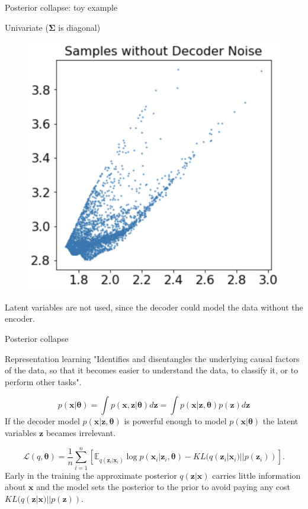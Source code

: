 \documentclass{beamer}
\newcommand{\bx}{\mathbf{x}}
\newcommand{\bz}{\mathbf{z}}
\newcommand{\bSigma}{\boldsymbol{\Sigma}}
\newcommand{\btheta}{\boldsymbol{\theta}}
\begin{document}
\begin{frame}{Posterior collapse: toy example}
\begin{block}{Univariate ($\bSigma$ is diagonal)}
\begin{minipage}[t]{0.33\columnwidth}
\begin{figure}[h]
		\end{figure}
		\end{minipage}%
		\begin{minipage}[t]{0.33\columnwidth}
		\begin{figure}[h]
			\centering
			\includegraphics[width=.75\linewidth]{figs/posterior_collapse_toy_6.png}
		\end{figure}
		\end{minipage}
	Latent variables are not used, since the decoder could model the data without the encoder.
	\end{block}
\end{frame}
\begin{frame}{Posterior collapse}
	\begin{block}{Representation learning}
		"Identifies and disentangles the underlying causal factors of the data, so that it becomes easier to understand the data, to classify it, or to perform other tasks".
	\end{block}
	\[
		p(\bx | \btheta) = \int p(\bx, \bz | \btheta) d \bz = \int p(\bx | \bz, \btheta) p(\bz) d \bz 
	\]
	If the decoder model $p(\bx | \bz, \btheta)$ is powerful enough to model $p(\bx | \btheta)$ the latent variables $\bz$ becames irrelevant.
	
	\[
		\mathcal{L}(q, \btheta) = \frac{1}{n} \sum_{i=1}^n \left[ \mathbb{E}_{q(\bz_i | \bx_i)} \log p(\bx_i | \bz_i, \btheta) - KL(q(\bz_i | \bx_i) || p(\bz_i)) \right].
	\]
	Early in the training the approximate posterior $q(\bz|\bx)$ carries little information about $\bx$ and the model sets the posterior to the prior to avoid paying any cost $KL(q(\bz|\bx)||p(\bz))$.
\end{frame}
\end{document}
